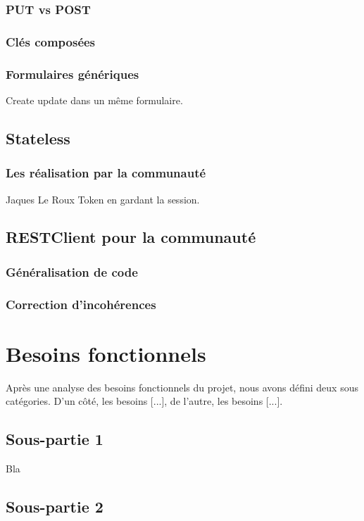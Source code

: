 \subsubsection{PUT vs POST}
\subsubsection{Clés composées}
\subsubsection{Formulaires génériques }
Create update dans un même formulaire.
\subsection{Stateless}
\subsubsection{Les réalisation par la communauté}

Jaques Le Roux Token en gardant la session.
\subsection{RESTClient pour la communauté}
\subsubsection{Généralisation de code}
\subsubsection{Correction d'incohérences}



\iffalse
\section{Besoins fonctionnels}

Après une analyse des besoins fonctionnels du projet, nous avons défini deux sous catégories. D'un côté, les besoins [...], de l'autre, les besoins [...].

\subsection{Sous-partie 1}

Bla

\subsection{Sous-partie 2}

